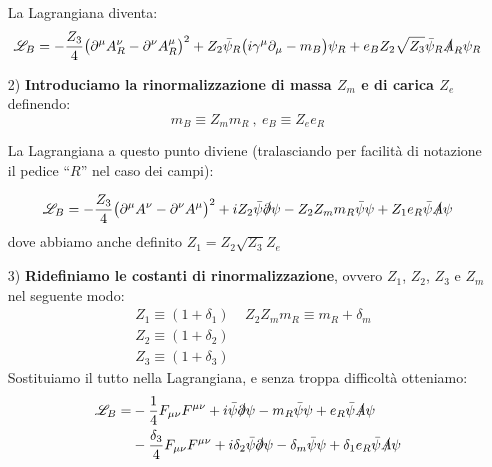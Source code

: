 \documentclass[../main.tex]{subfiles}
\begin{document}
\begin{enumerate}
    La Lagrangiana diventa:
    \begin{equation}
        \mathscr L_B = -\frac{Z_3}{4}\bigl( \partial^\mu A_R^\nu - \partial^\nu A_R^\mu \bigr)^2 + Z_2\bar \psi_R\bigl( i\gamma^\mu\partial_\mu - m_B\bigr)\psi_R + e_B Z_2 \sqrt{Z_3}\bar\psi_R\slashed{A}_R\psi_R
        \label{eq:bare_lagrangian_QED_v2}
    \end{equation}

    \item[2)] \textbf{Introduciamo la rinormalizzazione di massa $Z_m$ e di carica $Z_e$} definendo:
    \[ m_B \equiv Z_m m_R ~,~ e_B \equiv Z_e e_R\]

    La Lagrangiana a questo punto diviene (tralasciando per facilità di notazione il pedice “$R$” nel caso dei campi):

    \[\mathscr L_B = -\frac{Z_3}{4}\bigl( \partial^\mu A^\nu - \partial^\nu A^\mu \bigr)^2 + iZ_2 \bar\psi\slashed\partial \psi - Z_2Z_m m_R\bar\psi\psi +  Z_1 e_R\bar\psi\slashed{A}\psi\]
    dove abbiamo anche definito $Z_1=Z_2 \sqrt{Z_3}Z_e$

    \item[3)] \textbf{Ridefiniamo le costanti di rinormalizzazione}, ovvero $Z_1$, $Z_2$, $Z_3$ e $Z_m$ nel seguente modo: 
    \begin{align*}
        &Z_1 \equiv (1 + \delta_1) ~~~~~ Z_2 Z_m m_R \equiv m_R +\delta_m \\
        &Z_2 \equiv (1 + \delta_2) \\
        &Z_3 \equiv (1 + \delta_3) 
    \end{align*}
    Sostituiamo il tutto nella Lagrangiana, e senza troppa difficoltà otteniamo:
    \begin{align*}
        \mathscr L_B = &-\frac{1}{4} F_{\mu\nu} F^{\mu\nu} + i\bar\psi\slashed\partial \psi - m_R\bar\psi\psi + e_R\bar\psi\slashed{A}\psi \\
         & -\frac{\delta_3}{4} F_{\mu\nu} F^{\mu\nu}  + i\delta_2 \bar\psi\slashed\partial \psi - \delta_m \bar\psi\psi + \delta_1 e_R\bar\psi\slashed{A}\psi
    \end{align*}
\end{enumerate}
\end{document}

